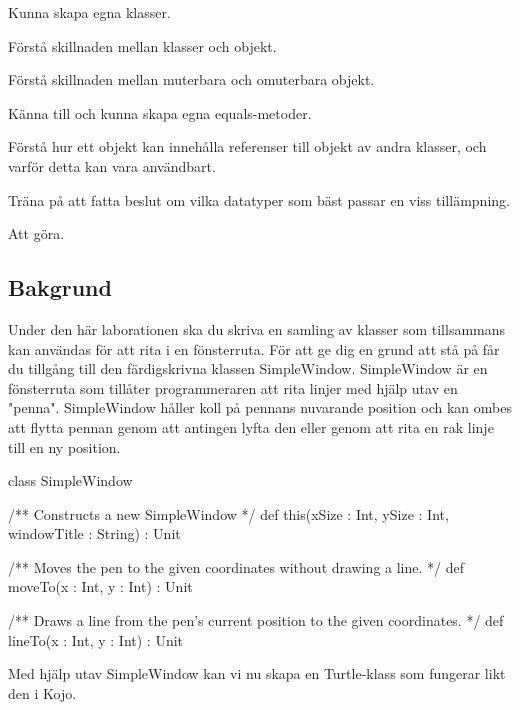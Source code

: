 

\Lab{\LabWeekSIX}

\begin{Goals}
\item Kunna skapa egna klasser.
\item Förstå skillnaden mellan klasser och objekt.
\item Förstå skillnaden mellan muterbara och omuterbara objekt.
\item Känna till och kunna skapa egna equals-metoder.
\item Förstå hur ett objekt kan innehålla referenser till objekt av andra klasser, och varför detta kan vara användbart.
\item Träna på att fatta beslut om vilka datatyper som bäst passar en viss tillämpning.
\end{Goals}

\begin{Preparations}
\item Att göra.
\end{Preparations}

\subsection{Bakgrund}

Under den här laborationen ska du skriva en samling av klasser som tillsammans kan användas för att rita i en fönsterruta. För att ge dig en grund att stå på får du tillgång till den färdigskrivna klassen SimpleWindow. SimpleWindow är en fönsterruta som tillåter programmeraren att rita linjer med hjälp utav en "penna". SimpleWindow håller koll på pennans nuvarande position och kan ombes att flytta pennan genom att antingen lyfta den eller genom att rita en rak linje till en ny position.

\begin{Code}
class SimpleWindow {
  /** Constructs a new SimpleWindow */
  def this(xSize : Int, ySize : Int, windowTitle : String) : Unit

  /** Moves the pen to the given coordinates without
      drawing a line. */
  def moveTo(x : Int, y : Int) : Unit

  /** Draws a line from the pen's current position
      to the given coordinates. */
  def lineTo(x : Int, y : Int) : Unit
}
\end{Code}

Med hjälp utav SimpleWindow kan vi nu skapa en Turtle-klass som fungerar likt den i Kojo. 

